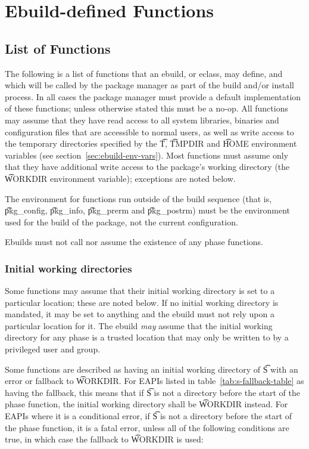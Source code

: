 \chapter{Ebuild-defined Functions}
\label{ch:ebuild-functions}

\section{List of Functions}

The following is a list of functions that an ebuild, or eclass, may define, and which will be called
by the package manager as part of the build and/or install process. In all cases the package manager
must provide a default implementation of these functions; unless otherwise stated this must be a
no-op. All functions may assume that they have read access to all system libraries, binaries and
configuration files that are accessible to normal users, as well as write access to the temporary
directories specified by the \t{T}, \t{TMPDIR} and \t{HOME} environment variables
(see section~\ref{sec:ebuild-env-vars}). Most functions must assume only that they have additional
write access to the package's working directory (the \t{WORKDIR} environment variable); exceptions
are noted below.

The environment for functions run outside of the build sequence (that is, \t{pkg_config},
\t{pkg_info}, \t{pkg_prerm} and \t{pkg_postrm}) must be the environment used for the build of the
package, not the current configuration.

Ebuilds must not call nor assume the existence of any phase functions.

\subsection{Initial working directories}
\label{sec:s-to-workdir-fallback}

Some functions may assume that their initial working directory is set to a particular location;
these are noted below. If no initial working directory is mandated, it may be set to anything and
the ebuild must not rely upon a particular location for it. The ebuild \emph{may} assume that the
initial working directory for any phase is a trusted location that may only be written to by a
privileged user and group.

 Some functions are described as having an initial working
directory of \t{S} with an error or fallback to \t{WORKDIR}\@. For EAPIs listed in
table~\ref{tab:s-fallback-table} as having the fallback, this means that if \t{S} is not a directory
before the start of the phase function, the initial working directory shall be \t{WORKDIR} instead.
For EAPIs where it is a conditional error, if \t{S} is not a directory before the start of the phase
function, it is a fatal error, unless all of the following conditions are true, in which case the
fallback to \t{WORKDIR} is used:

